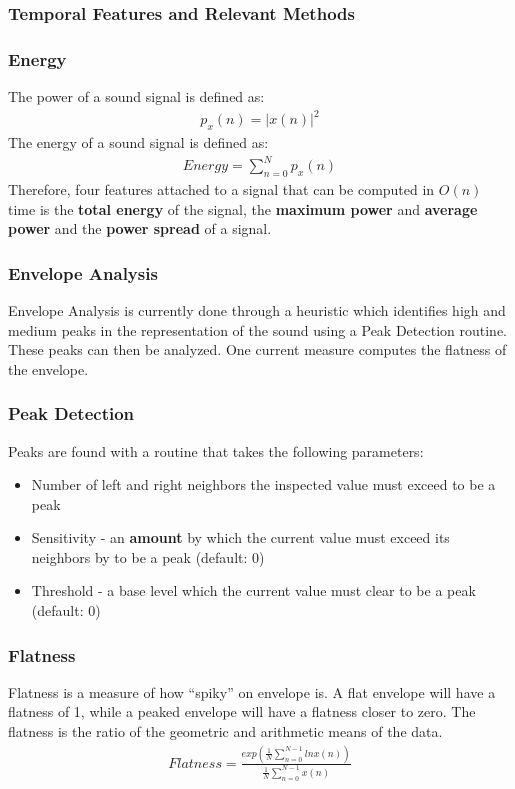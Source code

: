 \documentclass[DIV=calc, paper=a4, fontsize=11pt, twocolumn]{scrartcl}   %
\begin{document}
\subsubsection{Temporal Features and Relevant Methods}
\subsubsection {Energy}
   The power of a sound signal is defined as:
   \begin{align}
      p_x(n) = |x(n)|^2
   \end{align}
   The energy of a sound signal is defined as:
   \begin{align}
     Energy = \sum_{n=0}^N p_x(n)
   \end{align}
   Therefore, four features attached to a signal that can be computed in $O(n)$ time is the \textbf{total energy} of the signal, the \textbf{maximum power} and \textbf{average power} and the \textbf{power spread} of a signal.

   \subsubsection {Envelope Analysis}
   Envelope Analysis is currently done through a heuristic which identifies high and medium peaks in the representation of the sound using a Peak Detection routine. These peaks can then be analyzed. One current measure computes the flatness of the envelope.
    \subsubsection {Peak Detection}
    Peaks are found with a routine that takes the following parameters:
      \begin{itemize}
        \item Number of left and right neighbors the inspected value must exceed to be a peak
        \item Sensitivity - an \textbf{amount} by which the current value must exceed its neighbors by to be a peak (default: 0)
        \item Threshold - a base level which the current value must clear to be a peak (default: 0)
      \end{itemize}
   \subsubsection{Flatness}
      Flatness is a measure of how ``spiky'' on envelope is. A flat envelope will have a flatness of 1, while a peaked envelope will have a flatness closer to zero. The flatness is the ratio of the geometric and arithmetic means of the data.
      \begin{align}
      Flatness = \frac{exp(\frac{1}{N}\sum_{n=0}^{N-1}lnx(n))}{\frac{1}{N}\sum_{n=0}^{N-1}x(n)}
      \end{align}
\end{document}
